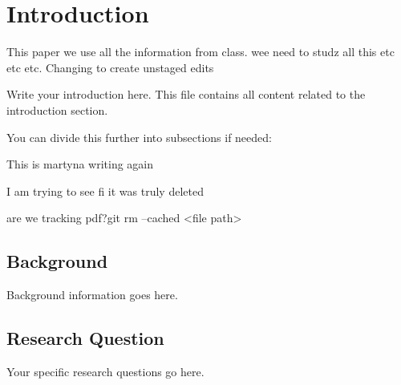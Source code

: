 \section{Introduction}
\label{sec:introduction}

This paper we use all the information from class.
wee need to studz all this etc etc etc. Changing to create unstaged edits

Write your introduction here. This file contains all content related to the introduction section.

You can divide this further into subsections if needed:

This is martyna writing again

I am trying to see fi it was truly deleted


are we tracking pdf?git rm --cached <file path>

\subsection{Background}
Background information goes here.

\subsection{Research Question}
Your specific research questions go here.